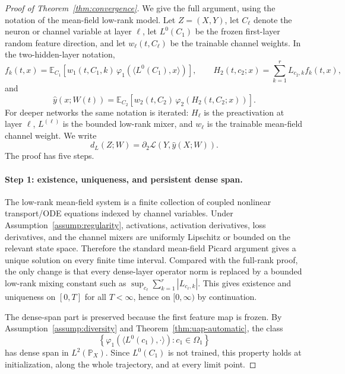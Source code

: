 \documentclass{article}
\newcommand{\E}{\mathbb{E}}
\newcommand{\Pp}{\mathbb{P}}
\newcommand{\calL}{\mathcal{L}}
\begin{document}
\begin{proof}[Proof of Theorem~\ref{thm:convergence}]
We give the full argument, using the notation of the mean-field low-rank model. Let $Z=(X,Y)$, let $C_\ell$ denote the neuron or channel variable at layer $\ell$, let $L^0(C_1)$ be the frozen first-layer random feature direction, and let $w_\ell(t,C_\ell)$ be the trainable channel weights. In the two-hidden-layer notation,
\begin{equation}
f_k(t,x)=
\E_{C_1}\!\left[
w_1(t,C_1,k)\,
\varphi_1(\langle L^0(C_1),x\rangle)
\right],
\qquad
H_2(t,c_2;x)=\sum_{k=1}^r L_{c_2,k}f_k(t,x),
\end{equation}
and
\begin{equation}
\hat y(x;W(t))=
\E_{C_2}\!\left[
w_2(t,C_2)\,
\varphi_2(H_2(t,C_2;x))
\right].
\end{equation}
For deeper networks the same notation is iterated: $H_\ell$ is the preactivation at layer $\ell$, $L^{(\ell)}$ is the bounded low-rank mixer, and $w_\ell$ is the trainable mean-field channel weight. We write
\begin{equation}
d_L(Z;W)=\partial_2\calL(Y,\hat y(X;W)).
\end{equation}
The proof has five steps.

\paragraph{Step 1: existence, uniqueness, and persistent dense span.}
The low-rank mean-field system is a finite collection of coupled nonlinear transport/ODE equations indexed by channel variables. Under Assumption~\ref{assump:regularity}, activations, activation derivatives, loss derivatives, and the channel mixers are uniformly Lipschitz or bounded on the relevant state space. Therefore the standard mean-field Picard argument gives a unique solution on every finite time interval. Compared with the full-rank proof, the only change is that every dense-layer operator norm is replaced by a bounded low-rank mixing constant such as $\sup_{c_\ell}\sum_{k=1}^r |L_{c_\ell,k}|$. This gives existence and uniqueness on $[0,T]$ for all $T<\infty$, hence on $[0,\infty)$ by continuation.

The dense-span part is preserved because the first feature map is frozen. By Assumption~\ref{assump:diversity} and Theorem~\ref{thm:uap-automatic}, the class
\begin{equation}
\left\{
\varphi_1(\langle L^0(c_1),\cdot\rangle):c_1\in\Omega_1
\right\}
\end{equation}
has dense span in $L^2(\Pp_X)$. Since $L^0(C_1)$ is not trained, this property holds at initialization, along the whole trajectory, and at every limit point.


\end{proof}
\end{document}
